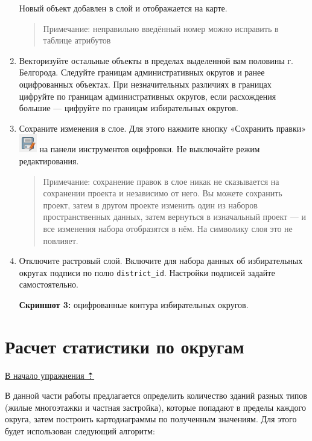 \documentclass[
  12pt,
]{book}
\begin{document}
\begin{enumerate}
  Новый объект добавлен в слой и отображается на карте.

  \begin{quote}
  Примечание: неправильно введённый номер можно исправить в таблице атрибутов
  \end{quote}
\item
  Векторизуйте остальные объекты в пределах выделенной вам половины г. Белгорода. Следуйте границам административных округов и ранее оцифрованных объектах. При незначительных различиях в границах цифруйте по границам административных округов, если расхождения большие --- цифруйте по границам избирательных округов.
\item
  Сохраните изменения в слое. Для этого нажмите кнопку «Сохранить правки» \includegraphics{images/Ex05/Editing7.png} на панели инструментов оцифровки. Не выключайте режим редактирования.

  \begin{quote}
  Примечание: сохранение правок в слое никак не сказывается на сохранении проекта и независимо от него. Вы можете сохранить проект, затем в другом проекте изменить один из наборов пространственных данных, затем вернуться в изначальный проект --- и все изменения набора отобразятся в нём. На символику слоя это не повлияет.
  \end{quote}
\item
  Отключите растровый слой. Включите для набора данных об избирательных округах подписи по полю \texttt{district\_id}. Настройки подписей задайте самостоятельно.

  \textbf{Скриншот 3:} оцифрованные контура избирательных округов.
\end{enumerate}

\hypertarget{map-ref-districts-stats}{%
\section{Расчет статистики по округам}\label{map-ref-districts-stats}}

\protect\hyperlink{map-ref-districts}{В начало упражнения ⇡}

В данной части работы предлагается определить количество зданий разных типов (жилые многоэтажки и частная застройка), которые попадают в пределы каждого округа, затем построить картодиаграммы по полученным значениям. Для этого будет использован следующий алгоритм:
\end{document}

